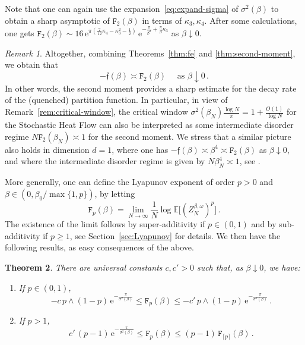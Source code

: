 \documentclass[11pt]{amsart}
\numberwithin{equation}{section}
\newcommand*{\EE}{\mathbb{E}}
\newcommand{\e}{\mathrm{e}}
\newcommand*{\tF}{\mathtt{F}}
\newcommand*{\tf}{\mathfrak{f}}
\theoremstyle{plain}
\newtheorem{theorem}{Theorem}[section]
\theoremstyle{definition}
\theoremstyle{remark}
\newtheorem{remark}[theorem]{Remark}
\begin{document}
Note that one can again use the expansion~\eqref{eq:expand-sigma} of \(\sigma^2(\beta)\) to obtain a sharp asymptotic of \(\tF_2(\beta)\) in terms of \(\kappa_3,\kappa_4\).
After some calculations, one gets \(\tF_2(\beta)  \sim 16\, \e^{\pi(\frac{7}{12}\kappa_4-\kappa_3^2 - \frac{1}{2})}\, \e^{-\frac{\pi}{\beta^2} + \frac{\pi}{\beta} \kappa_3} \) as \(\beta \downarrow 0\).

\begin{remark}
       Altogether, combining Theorems~\ref{thm:fe} and \ref{thm:second-moment}, we obtain that
       \[
       -\tf(\beta) \asymp \tF_2(\beta) \quad \text{ as } \beta\downarrow 0\,.
       \]
       In other words, the second moment provides a sharp estimate for the decay rate of the (quenched) partition function.
       In particular, in view of Remark~\ref{rem:critical-window}, the critical window \( \sigma^2 (\beta_N) \frac{\log N}{\pi}= 1+ \frac{O(1)}{\log N}\) for the Stochastic Heat Flow \cite{CSZ23} can also be interpreted as some intermediate disorder regime \(N\tF_2(\beta_N) \asymp 1\) for the second moment. 
       We stress that a similar picture also holds in dimension \(d=1\), where one has \(-\tf(\beta) \asymp \beta^4 \asymp \tF_2(\beta)\) as \(\beta\downarrow 0\), and where the intermediate disorder regime is given by \(N \beta_N^4 \asymp 1\), see \cite{AKQ14a}.
\end{remark}


More generally, one can define the Lyapunov exponent of order \(p>0\) and $\beta \in (0,\beta_0/\max\{1,p\})$, by letting
\[
\tF_p(\beta) = \lim_{N\to\infty} \frac{1}{N} \log \EE\big[(Z_N^{\beta,\omega})^p \big] \,.
\]
The existence of the limit follows by super-additivity if \(p\in (0,1)\) and by sub-additivity if \(p\geq 1\), see Section~\ref{sec:Lyapunov} for details.
We then have the following results, as easy consequences of the above.

\begin{theorem}
       \label{thm:Lyapunov}
       There are universal constants \(c,c'>0\) such that, as \(\beta \downarrow 0\), we have:
       \begin{enumerate}[label=(\roman*)]
              \item \label{i-p-01}
              If \(p\in (0,1)\),
                     \[
                     - c\, p\wedge (1-p)\, \e^{-\frac{\pi}{\sigma^2(\beta)}}  \leq \tF_p(\beta) \leq - c'\, p\wedge (1-p)\, \e^{-\frac{\pi}{\sigma^2(\beta)}} \,.
                     \]
              \item \label{ii-p>1}
              If \(p >1\),
                     \[
                     c'\, (p-1)\, \e^{-\frac{\pi}{\sigma^2(\beta)}}  \leq \tF_p(\beta) \leq  (p-1)\, \tF_{\lceil p \rceil}(\beta) \,.
                     \]
       \end{enumerate}
\end{theorem}
\end{document}
